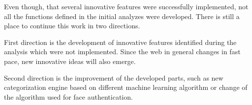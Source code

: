 Even though, that several innovative features were successfully implemented, not all the functions defined in the initial analyzes were developed. There is still a place to continue this work in two directions.

First direction is the development of innovative features identified during the analysis which were not implemented. Since the web in general changes in fast pace, new innovative ideas will also emerge.

Second direction is the improvement of the developed parts, such as new categorization engine based on different machine learning algorithm or change of the algorithm used for face authentication.